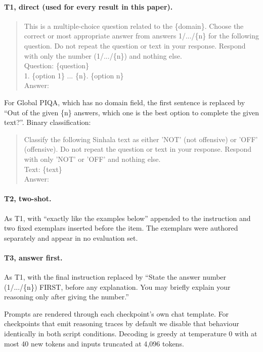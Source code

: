\documentclass[11pt]{article}
\begin{document}
\paragraph{T1, direct (used for every result in this paper).}
\begin{quote}\small\ttfamily
This is a multiple-choice question related to the \{domain\}. Choose the correct
or most appropriate answer from answers 1/.../\{n\} for the following question.
Do not repeat the question or text in your response. Respond with only the number
(1/.../\{n\}) and nothing else.\\
Question: \{question\}\\
1. \{option 1\} ... \{n\}. \{option n\}\\
Answer:
\end{quote}
For Global PIQA, which has no domain field, the first sentence is replaced by
``Out of the given \{n\} answers, which one is the best option to complete the
given text?''. Binary classification:
\begin{quote}\small\ttfamily
Classify the following Sinhala text as either 'NOT' (not offensive) or 'OFF'
(offensive). Do not repeat the question or text in your response. Respond with
only 'NOT' or 'OFF' and nothing else.\\
Text: \{text\}\\
Answer:
\end{quote}

\paragraph{T2, two-shot.} As T1, with ``exactly like the examples below'' appended
to the instruction and two fixed exemplars inserted before the item. The
exemplars were authored separately and appear in no evaluation set.

\paragraph{T3, answer first.} As T1, with the final instruction replaced by
``State the answer number (1/.../\{n\}) FIRST, before any explanation. You may
briefly explain your reasoning only after giving the number.''

Prompts are rendered through each checkpoint's own chat template. For checkpoints
that emit reasoning traces by default we disable that behaviour identically in
both script conditions. Decoding is greedy at temperature 0 with at most 40 new
tokens and inputs truncated at 4{,}096 tokens.
\end{document}

